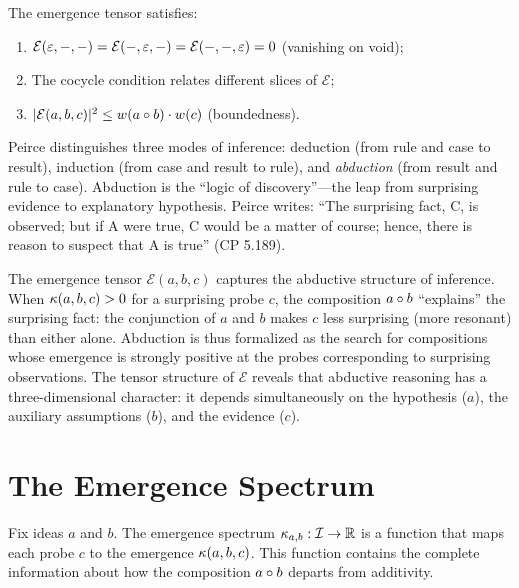 \begin{proposition}
The emergence tensor satisfies:
\begin{enumerate}
    \item $\mathcal{E}(\varepsilon, -, -) = \mathcal{E}(-, \varepsilon, -) =
          \mathcal{E}(-, -, \varepsilon) = 0$ (vanishing on void);
    \item The cocycle condition relates different slices of $\mathcal{E}$;
    \item $|\mathcal{E}(a,b,c)|^2 \leq w(a \circ b) \cdot w(c)$
          (boundedness).
\end{enumerate}
\end{proposition}

\begin{interpretation}\label{interp:ch5:peirce_abduction}
Peirce distinguishes three modes of inference: deduction (from rule and
case to result), induction (from case and result to rule), and
\emph{abduction} (from result and rule to case). Abduction is the
``logic of discovery''---the leap from surprising evidence to explanatory
hypothesis. Peirce writes: ``The surprising fact, C, is observed; but
if A were true, C would be a matter of course; hence, there is reason
to suspect that A is true'' (CP 5.189).

The emergence tensor $\mathcal{E}(a, b, c)$ captures the abductive
structure of inference. When $\kappa(a, b, c) > 0$ for a surprising
probe $c$, the composition $a \circ b$ ``explains'' the surprising
fact: the conjunction of $a$ and $b$ makes $c$ less surprising (more
resonant) than either alone. Abduction is thus formalized as the search
for compositions whose emergence is strongly positive at the probes
corresponding to surprising observations. The tensor structure of
$\mathcal{E}$ reveals that abductive reasoning has a three-dimensional
character: it depends simultaneously on the hypothesis ($a$), the
auxiliary assumptions ($b$), and the evidence ($c$).
\end{interpretation}

\section{The Emergence Spectrum}

Fix ideas $a$ and $b$. The emergence spectrum $\kappa_{a,b} : \mathcal{I} \to \mathbb{R}$
is a function that maps each probe $c$ to the emergence $\kappa(a,b,c)$.
This function contains the complete information about how the composition
$a \circ b$ departs from additivity.

